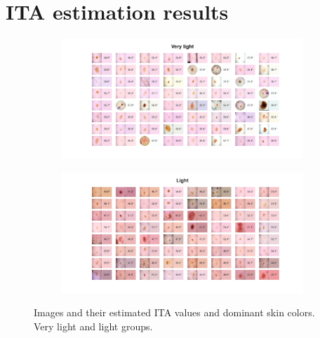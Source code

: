 \chapter{ITA estimation results}
\label{ap:skin_color}

\begin{figure}[hp]
     \centering
     \begin{subfigure}{0.99\textwidth}
         \centering
         \includegraphics[width=\textwidth]{figures/eda/1 - Very light.png}
     \end{subfigure}
     \hfill
     \begin{subfigure}{0.99\textwidth}
         \centering
         \includegraphics[width=\textwidth]{figures/eda/2- Light.png}
     \end{subfigure}
    \hfill
	\caption{Images and their estimated ITA values and dominant skin colors. Very light and light groups.}
	\label{fig:skin_colors_1}
\end{figure}



